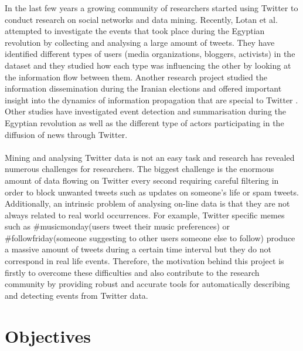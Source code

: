 In the last few years a growing community of researchers started using Twitter to conduct research on social networks 
and data mining. Recently, Lotan et al. \citep{Lotan} attempted to investigate the events that took place during the
Egyptian revolution by collecting and analysing a large amount of tweets. They have identified different types
of users (media organizations, bloggers, activists) in the dataset and they studied how each type was influencing
the other by looking at the information flow between them. Another research project studied the information
dissemination during the Iranian elections and offered important insight into the dynamics of information propagation 
that are special to Twitter \citep{Zhou:2010:IRT:1964858.1964875}. Other studies have investigated event detection and summarisation during
the Egyptian revolution as well as the different type of actors participating in the diffusion of news through Twitter.\\\\
Mining and analysing Twitter data is not an easy task and research has revealed numerous challenges for researchers.
The biggest challenge is the enormous amount of data flowing on Twitter every second requiring careful filtering in
order to block unwanted tweets such as updates on someone's life or spam tweets. Additionally, an intrinsic problem
of analysing on-line data is that they are not always related to real world occurrences. For example, Twitter specific
memes such as \#musicmonday(users tweet their music preferences) or \#followfriday(someone suggesting to other
users someone else to follow) produce a massive amount of tweets during a certain time interval but they do not
correspond in real life events.
Therefore, the motivation behind this project is firstly to overcome these difficulties and also contribute to the
research community by providing robust and accurate tools for automatically describing and detecting events from Twitter data. 

\section{Objectives}

